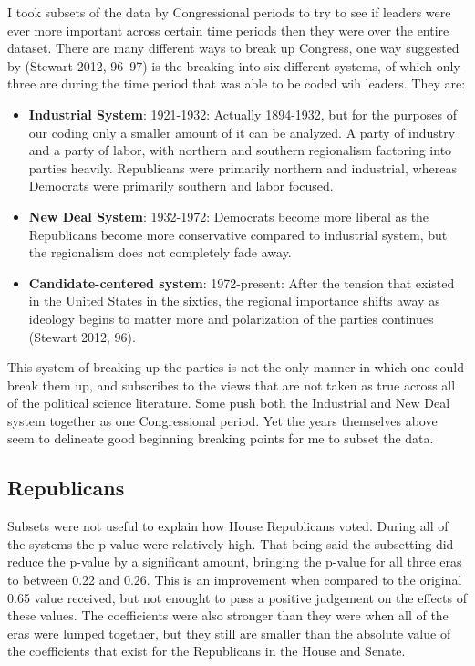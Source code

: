 \documentclass[12pt,twoside]{reedthesis}
\begin{document}
  I took subsets of the data by Congressional periods to try to see if
  leaders were ever more important across certain time periods then they
  were over the entire dataset. There are many different ways to break up
  Congress, one way suggested by (Stewart 2012, 96--97) is the breaking
  into six different systems, of which only three are during the time
  period that was able to be coded wih leaders. They are:
  
  \begin{itemize}
  \itemsep1pt\parskip0pt
  \item
    \textbf{Industrial System}: 1921-1932: Actually 1894-1932, but for the
    purposes of our coding only a smaller amount of it can be analyzed. A
    party of industry and a party of labor, with northern and southern
    regionalism factoring into parties heavily. Republicans were primarily
    northern and industrial, whereas Democrats were primarily southern and
    labor focused.
  \item
    \textbf{New Deal System}: 1932-1972: Democrats become more liberal as
    the Republicans become more conservative compared to industrial
    system, but the regionalism does not completely fade away.
  \item
    \textbf{Candidate-centered system}: 1972-present: After the tension
    that existed in the United States in the sixties, the regional
    importance shifts away as ideology begins to matter more and
    polarization of the parties continues (Stewart 2012, 96).
  \end{itemize}
  
  This system of breaking up the parties is not the only manner in which
  one could break them up, and subscribes to the views that are not taken
  as true across all of the political science literature. Some push both
  the Industrial and New Deal system together as one Congressional period.
  Yet the years themselves above seem to delineate good beginning breaking
  points for me to subset the data.
  
  \subsection{Republicans}\label{republicans-1}
  
  Subsets were not useful to explain how House Republicans voted. During
  all of the systems the p-value were relatively high. That being said the
  subsetting did reduce the p-value by a significant amount, bringing the
  p-value for all three eras to between 0.22 and 0.26. This is an
  improvement when compared to the original 0.65 value received, but not
  enought to pass a positive judgement on the effects of these values. The
  coefficients were also stronger than they were when all of the eras were
  lumped together, but they still are smaller than the absolute value of
  the coefficients that exist for the Republicans in the House and Senate.
  
\end{document}
